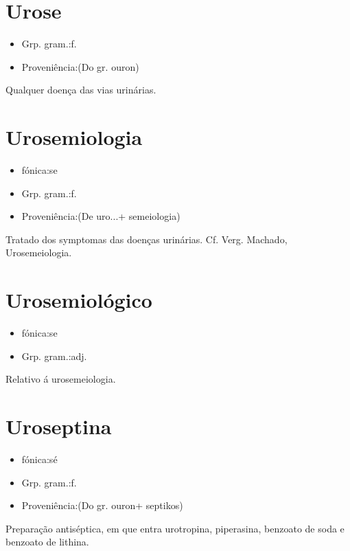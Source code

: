 \documentclass{article}
\begin{document}
\section{Urose}
\begin{itemize}
\item {Grp. gram.:f.}
\end{itemize}
\begin{itemize}
\item {Proveniência:(Do gr. \textunderscore ouron\textunderscore )}
\end{itemize}
Qualquer doença das vias urinárias.
\section{Urosemiologia}
\begin{itemize}
\item {fónica:se}
\end{itemize}
\begin{itemize}
\item {Grp. gram.:f.}
\end{itemize}
\begin{itemize}
\item {Proveniência:(De \textunderscore uro...\textunderscore  + \textunderscore semeiologia\textunderscore )}
\end{itemize}
Tratado dos symptomas das doenças urinárias. Cf. Verg. Machado, \textunderscore Urosemeiologia\textunderscore .
\section{Urosemiológico}
\begin{itemize}
\item {fónica:se}
\end{itemize}
\begin{itemize}
\item {Grp. gram.:adj.}
\end{itemize}
Relativo á urosemeiologia.
\section{Uroseptina}
\begin{itemize}
\item {fónica:sé}
\end{itemize}
\begin{itemize}
\item {Grp. gram.:f.}
\end{itemize}
\begin{itemize}
\item {Proveniência:(Do gr. \textunderscore ouron\textunderscore  + \textunderscore septikos\textunderscore )}
\end{itemize}
Preparação antiséptica, em que entra urotropina, piperasina, benzoato de soda e benzoato de lithina.
\end{document}
